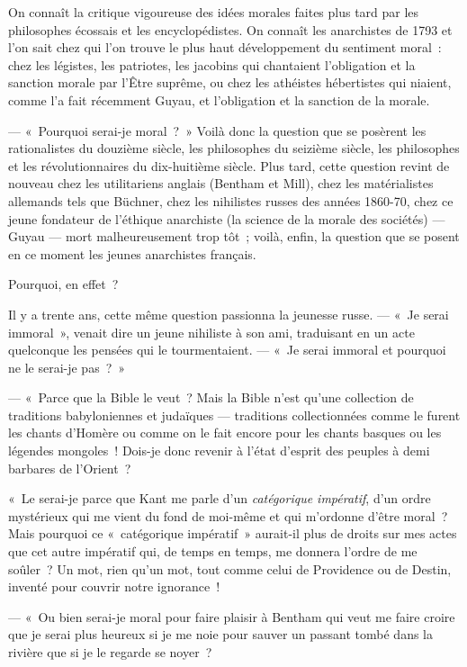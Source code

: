 \documentclass[french,twoside]{book} %
\begin{document}
On connaît la critique vigoureuse des idées morales faites plus tard par les philosophes écossais et les encyclopédistes. On connaît les anarchistes  de 1793 et l’on sait chez qui l’on trouve le plus haut développement du sentiment moral : chez les légistes, les patriotes, les jacobins qui chantaient l’obligation et la sanction morale par l’Être suprême, ou chez les athéistes hébertistes qui niaient, comme l’a fait récemment Guyau, et l’obligation et la sanction de la morale.\par
\bigbreak
\noindent — « Pourquoi serai-je moral ? » Voilà donc la question que se posèrent les rationalistes du douzième siècle, les philosophes du seizième siècle, les philosophes et les révolutionnaires du dix-huitième siècle. Plus tard, cette question revint de nouveau chez les utilitariens anglais (Bentham et Mill), chez les matérialistes allemands tels que Büchner, chez les nihilistes russes des années 1860-70, chez ce jeune fondateur de l’éthique anarchiste (la science de la morale des sociétés) — Guyau — mort malheureusement trop tôt ; voilà, enfin, la question que se posent en ce moment les jeunes anarchistes français.\par
\bigbreak
\noindent Pourquoi, en effet ?\par
Il y a trente ans, cette même question passionna la jeunesse russe. — « Je serai immoral », venait dire un jeune nihiliste à son ami, traduisant en un acte quelconque les pensées qui le tourmentaient. — « Je serai immoral et pourquoi ne le serai-je pas ? »\par
— « Parce que la Bible le veut ? Mais la Bible n’est qu’une collection de traditions babyloniennes et judaïques — traditions collectionnées comme le furent les chants d’Homère ou comme on le fait encore pour les chants basques ou les légendes mongoles ! Dois-je donc revenir à l’état d’esprit des peuples à demi barbares de l’Orient ?\par
« Le serai-je parce que Kant me parle d’un \emph{catégorique impératif}, d’un ordre mystérieux qui me vient du fond de moi-même et qui m’ordonne d’être moral ? Mais pourquoi ce « catégorique impératif » aurait-il plus de droits sur mes actes que cet autre impératif qui, de temps en temps, me donnera l’ordre de me soûler ? Un mot, rien qu’un mot, tout comme celui de Providence ou de Destin, inventé pour couvrir notre ignorance !\par
— « Ou bien serai-je moral pour faire plaisir à Bentham qui veut me faire croire que je serai plus heureux si je me noie pour sauver un passant tombé dans la rivière que si je le regarde se noyer ?\par
\end{document}
